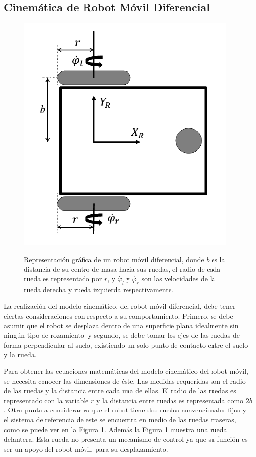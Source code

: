 \subsection{Cinemática de Robot Móvil Diferencial}
\begin{figure}%
\centering \footnotesize
{\includegraphics[width=0.40\linewidth]{images/kinematic_model.png}}
\captionsetup{font=footnotesize}
\caption{Representación gráfica de un robot móvil diferencial, donde 
$b$ es la distancia de su centro de masa hacia sus ruedas, el radio de cada 
rueda es representado por $r$, y $\dot{\varphi_{l}}$ y 
$\dot{\varphi_{r}}$ son las velocidades de la rueda derecha y rueda izquierda 
respectivamente.}
\label{fig:RMkinematic}
\end{figure}
La realización del modelo cinemático, del robot móvil diferencial, debe 
tener ciertas consideraciones con respecto a su comportamiento. Primero, 
se debe asumir que el robot se desplaza dentro de una superficie plana 
idealmente sin ningún tipo de rozamiento, y segundo,  se debe tomar los ejes
de las ruedas de forma perpendicular al suelo, existiendo un solo punto 
de contacto entre el suelo y la rueda.


Para obtener las ecuaciones matemáticas del modelo cinemático del robot móvil, se
necesita conocer las dimensiones de éste. Las medidas requeridas son el radio de las 
ruedas y la distancia entre cada una de ellas. El radio de las ruedas es representado
con la variable $r$ y la distancia entre ruedas es representada como $2b$. Otro punto 
a considerar es que el robot tiene dos ruedas convencionales fijas y el sistema de
referencia de este se encuentra en medio de las ruedas traseras, como se puede ver en 
la Figura \ref{fig:RMkinematic}. Además la Figura \ref{fig:RMkinematic} muestra una 
rueda delantera. Esta rueda no presenta un mecanismo de control ya que su función es
ser un apoyo del robot móvil, para su desplazamiento.

